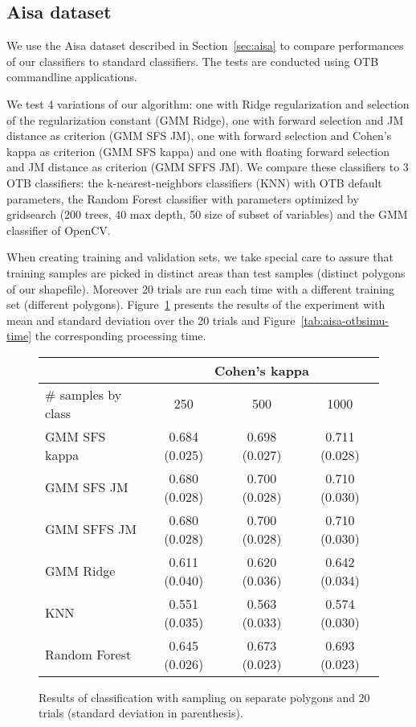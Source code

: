 \documentclass[a4paper,11pt,DIV=16,abstracton]{scrartcl}
\begin{document}
    \subsection{Aisa dataset}

    We use the Aisa dataset described in Section~\ref{sec:aisa} to compare performances of our classifiers to standard classifiers. The tests are conducted using OTB commandline applications.

    We test 4 variations of our algorithm: one with Ridge regularization and selection of the regularization constant (GMM Ridge), one with forward selection and JM distance as criterion (GMM SFS JM), one with forward selection and Cohen's kappa as criterion (GMM SFS kappa) and one with floating forward selection and JM distance as criterion (GMM SFFS JM). We compare these classifiers to 3 OTB classifiers: the k-nearest-neighbors classifiers (KNN) with OTB default parameters, the Random Forest classifier with parameters optimized by gridsearch (200 trees, 40 max depth, 50 size of subset of variables) and the GMM classifier of OpenCV.

    When creating training and validation sets, we take special care to assure that training samples are picked in distinct areas than test samples (distinct polygons of our shapefile). Moreover 20 trials are run each time with a different training set (different polygons). Figure~\ref{tab:aisa-otbsimu} presents the results of the experiment with mean and standard deviation over the 20 trials and Figure~\ref{tab:aisa-otbsimu-time} the corresponding processing time.

    \begin{figure}[!ht]
        \centering
        \begin{tabular}{|l|c|c|c|}\hline
             & \multicolumn{3}{c|}{\bfseries Cohen's kappa} \\ \hline
            \# samples by class & 250 & 500 & 1000 \\ \hline

            GMM SFS kappa & 0.684 (0.025) & 0.698 (0.027) & 0.711 (0.028) \\
            GMM SFS JM &    0.680 (0.028) & 0.700 (0.028) & 0.710 (0.030) \\
            GMM SFFS JM &   0.680 (0.028) & 0.700 (0.028) & 0.710 (0.030) \\
            GMM Ridge &     0.611 (0.040) & 0.620 (0.036) & 0.642 (0.034) \\
            KNN &           0.551 (0.035) & 0.563 (0.033) & 0.574 (0.030) \\
            Random Forest & 0.645 (0.026) & 0.673 (0.023) & 0.693 (0.023) \\

            \hline
        \end{tabular}
        \caption{Results of classification with sampling on separate polygons and 20 trials (standard deviation in parenthesis).\label{tab:aisa-otbsimu}}
    \end{figure}
\end{document}
